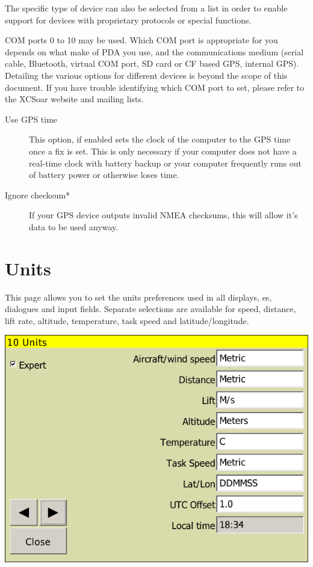 The specific type of device can also be selected from a list in order
to enable support for devices with proprietary protocols or special
functions.

COM ports 0 to 10 may be used.  Which COM port is appropriate for you
depends on what make of PDA you use, and the communications medium
(serial cable, Bluetooth, virtual COM port, SD card or CF based GPS,
internal GPS).  Detailing the various options for different devices is
beyond the scope of this document.  If you have trouble identifying
which COM port to set, please refer to the XCSoar website and mailing
lists.

\begin{description}
\item[Use GPS time] This option, if enabled sets the clock of the computer to the GPS time once a fix is set.  
This is only necessary if your computer does not have a real-time clock with battery backup or your computer 
frequently runs out of battery power or otherwise loses time.
\item[Ignore checksum*] If your GPS device outputs invalid NMEA checksums, this will allow it's data to be used anyway.
\end{description}

\clearpage
\section{Units}

This page allows you to set the units preferences used in all
displays, {\InfoBox}es, dialogues and input fields.  Separate selections
are available for speed, distance, lift rate, altitude, temperature, task
speed and latitude/longitude.

\begin{center}
\includegraphics[angle=0,width=0.8\linewidth,keepaspectratio='true']{figures/config-units.png}
\end{center}

